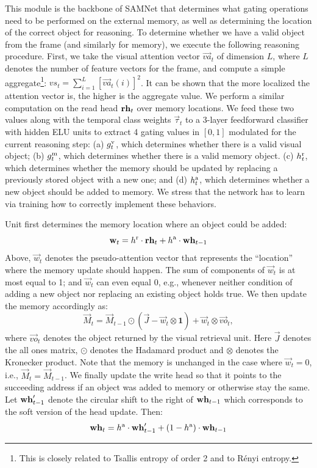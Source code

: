 This module is the backbone of SAMNet that determines what gating operations need to be performed on the external memory, as well as
determining the location of the correct object for reasoning.
To determine whether we have a valid object from the frame (and similarly for memory), we execute the following reasoning procedure.
First, we take the visual attention vector $\vec{va}_t$ of dimension $L$, where $L$ denotes the number of feature vectors for the frame,
and compute a simple aggregate\footnote{%
	This is closely related to Tsallis entropy of order 2 and to R\'{e}nyi entropy.}: %
$vs_t = \sum_{i=1}^L [\vec{va}_t(i)]^2$. It can be shown that the more localized the attention
vector is, the higher is the aggregate value.
We perform a similar computation on the read head $\mathbf{rh}_t$ over memory locations.
We feed these two values along with the temporal class weights $\vec{\tau}_t$ to a 3-layer feedforward classifier with hidden ELU units to extract 4 gating values
in $[0,1]$ modulated for the current reasoning step:
(a) $g^{\mathrm{v}}_t$, which determines whether there is a valid visual object;
(b) $g^{\mathrm{m}}_t$, which determines whether there is a valid memory object. 
(c) $h^{\mathrm{r}}_t$, which determines whether the memory should be updated by replacing a previously stored object with a new one; and
(d) $h^{\mathrm{a}}_t$, which determines whether a new object should be added to memory.
We stress that the network has to learn via training how to correctly implement these behaviors.

Unit first determines the memory location where an object could be added:
\[ \mathbf{w}_t = h^{\mathrm{r}} \cdot \mathbf{rh}_t + h^{\mathrm{a}} \cdot \mathbf{wh}_{t-1} \]
Above, $\vec{w}_t$ denotes the pseudo-attention vector that represents the ``location'' where the memory update should happen.
The sum of components of $\vec{w}_t$ is at most equal to 1; and $\vec{w}_t$ can even equal 0, e.g., whenever neither condition
of adding a new object nor replacing an existing object holds true.
We then update the memory accordingly as:
\[ \vec{M}_t = \vec{M}_{t-1} \odot (\vec{J} - \vec{w}_t  \otimes \mathbf{1}) + \vec{w}_t  \otimes \vec{vo}_t,\]
where $\vec{vo}_t$ denotes the object returned by the visual retrieval unit. 
Here $\vec{J}$ denotes the all ones matrix, $\odot$ denotes the Hadamard product and $\otimes$ denotes the Kronecker product. 
Note that the memory is unchanged in the case where $\vec{w}_t = 0$, i.e., $\vec{M}_t = \vec{M}_{t-1}$.
We finally update the write head so that it points to the succeeding address if an object was added to memory or otherwise stay the same.
Let $\mathbf{wh}'_{t-1}$ denote the circular shift to the right of $\mathbf{wh}_{t-1}$ which corresponds to the soft version of the head update.
Then:
\[ \mathbf{wh}_t = h^{\mathrm{a}} \cdot \mathbf{wh}'_{t-1} + (1-h^{\mathrm{a}}) \cdot \mathbf{wh}_{t-1} \]

